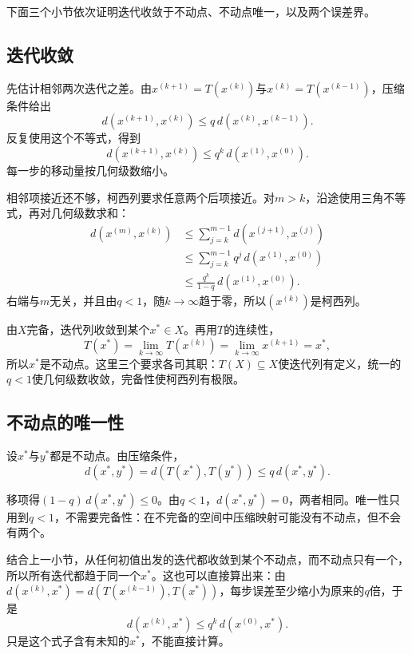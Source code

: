 下面三个小节依次证明迭代收敛于不动点、不动点唯一，以及两个误差界。

\subsection{迭代收敛}
\label{sec:mmap-iteration-convergence}

先估计相邻两次迭代之差。由$x^{(k+1)}=T(x^{(k)})$与$x^{(k)}=T(x^{(k-1)})$，压缩条件给出
\[
 d(x^{(k+1)},x^{(k)})\leq q\,d(x^{(k)},x^{(k-1)}).
\]
反复使用这个不等式，得到
\[
 d(x^{(k+1)},x^{(k)})\leq q^k\,d(x^{(1)},x^{(0)}).
\]
每一步的移动量按几何级数缩小。

相邻项接近还不够，柯西列要求任意两个后项接近。对$m>k$，沿途使用三角不等式，再对几何级数求和：
\begin{equation}
 \begin{aligned}
 d(x^{(m)},x^{(k)})
 &\leq\sum_{j=k}^{m-1}d(x^{(j+1)},x^{(j)})\\
 &\leq\sum_{j=k}^{m-1}q^j\,d(x^{(1)},x^{(0)})\\
 &\leq\frac{q^k}{1-q}\,d(x^{(1)},x^{(0)}).
 \end{aligned}
 \label{eq:mmap-contraction-cauchy}
\end{equation}
右端与$m$无关，并且由$q<1$，随$k\to\infty$趋于零，所以$(x^{(k)})$是柯西列。

由$X$完备，迭代列收敛到某个$x^\ast\in X$。再用$T$的连续性，
\[
 T(x^\ast)=\lim_{k\to\infty}T(x^{(k)})=\lim_{k\to\infty}x^{(k+1)}=x^\ast,
\]
所以$x^\ast$是不动点。这里三个要求各司其职：$T(X)\subseteq X$使迭代列有定义，统一的$q<1$使几何级数收敛，完备性使柯西列有极限。

\subsection{不动点的唯一性}
\label{sec:mmap-fixed-point-uniqueness}

设$x^\ast$与$y^\ast$都是不动点。由压缩条件，
\[
 d(x^\ast,y^\ast)=d(T(x^\ast),T(y^\ast))\leq q\,d(x^\ast,y^\ast).
\]

移项得$(1-q)\,d(x^\ast,y^\ast)\leq0$。由$q<1$，$d(x^\ast,y^\ast)=0$，两者相同。唯一性只用到$q<1$，不需要完备性：在不完备的空间中压缩映射可能没有不动点，但不会有两个。

结合上一小节，从任何初值出发的迭代都收敛到某个不动点，而不动点只有一个，所以所有迭代都趋于同一个$x^\ast$。这也可以直接算出来：由$d(x^{(k)},x^\ast)=d(T(x^{(k-1)}),T(x^\ast))$，每步误差至少缩小为原来的$q$倍，于是
\[
 d(x^{(k)},x^\ast)\leq q^k\,d(x^{(0)},x^\ast).
\]
只是这个式子含有未知的$x^\ast$，不能直接计算。

